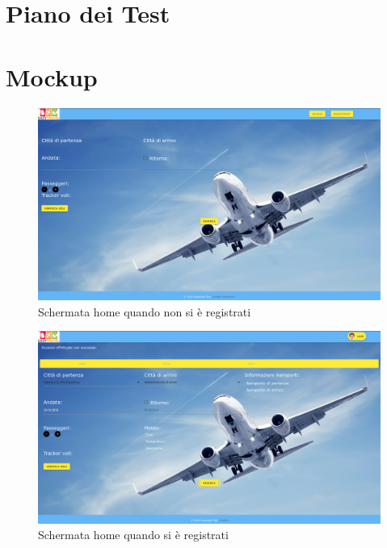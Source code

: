 \documentclass[11pt]{article}
\begin{document}
\section{Piano dei Test}

\pagebreak


\section{Mockup}
\begin{figure}[!ht]
	\includegraphics[width=1\textwidth]{./Mockup/Home-non-registrato} %
	\caption{Schermata home quando non si è registrati}
	\label{fig:homenotreg}
\end{figure}

\begin{figure}[!ht]
	\includegraphics[width=1\textwidth]{./Mockup/Home-registrato} %
	\caption{Schermata home quando si è registrati}
	\label{fig:homereg}
\end{figure}
\end{document}
